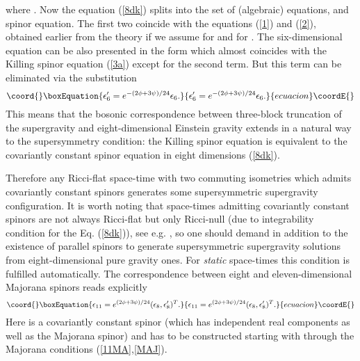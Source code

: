 \documentclass[a4paper,12pt]{article}
\begin{document}
where \coordHE{}. Now
the \coordHE{} equation (\ref{8dk}) splits into the set of \coordHE{}
(algebraic) equations, and \coordHE{}  \coordHE{} spinor equation. The
first two coincide with the equations (\ref{1}) and (\ref{2}),
obtained earlier from the \coordHE{} theory if we assume \coordHE{} for
\coordHE{} and \coordHE{} for \coordHE{}.
The six-dimensional \coordHE{} equation can be also presented in the
form which almost coincides with the \coordHE{} Killing spinor
equation (\ref{3a}) except for the second term. But this term can
be eliminated via the substitution
\begin{equation}\coord{}\boxEquation{
\epsilon'_6 = e^{-(2\phi+3\psi)/24} \epsilon_6.
}{
\epsilon'_6 = e^{-(2\phi+3\psi)/24} \epsilon_6.
}{ecuacion}\coordE{}\end{equation}
This means that the bosonic correspondence between three-block
truncation of the \coordHE{} supergravity and eight-dimensional
Einstein gravity extends in a natural way to the supersymmetry
condition: the \coordHE{} Killing spinor equation is equivalent to
the covariantly constant spinor equation in eight dimensions
(\ref{8dk}).

Therefore any Ricci-flat \coordHE{} space-time with two commuting
isometries which admits covariantly constant spinors generates
some supersymmetric \coordHE{} supergravity configuration. It is
worth noting that space-times admitting covariantly constant
spinors are not always Ricci-flat but only Ricci-null (due to
integrability condition for the Eq. (\ref{8dk})), see e.g.
\cite{Fig99}, so one should demand \coordHE{} in addition to
the existence of parallel spinors to generate supersymmetric
supergravity solutions from eight-dimensional pure gravity
ones. For {\it static} \coordHE{} space-times this condition is
fulfilled automatically. The correspondence between eight and
eleven-dimensional Majorana spinors reads explicitly
\begin{equation}\coord{}\boxEquation{\label{expr}
\epsilon_{11} = e^{(2\phi+3\psi)/24} (\epsilon_8,\epsilon_8')^T.
}{\epsilon_{11} = e^{(2\phi+3\psi)/24} (\epsilon_8,\epsilon_8')^T.
}{ecuacion}\coordE{}\end{equation}
Here \coordHE{} is a covariantly constant \coordHE{} spinor (which
has \coordHE{} independent real components as well as the \coordHE{}
Majorana spinor) and \coordHE{} has to be constructed starting
with \coordHE{} through the Majorana conditions
(\ref{11MA},\ref{MAJ}).
\end{document}
